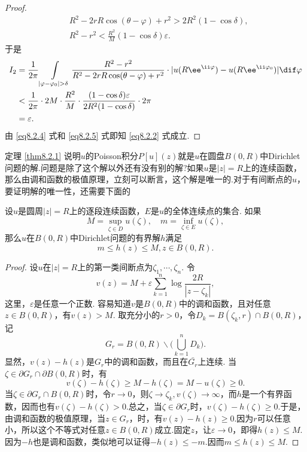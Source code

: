 \begin{proof}
\begin{align*}
&R^2-2rR\cos(\theta-\varphi)+r^2>2R^2(1-\cos\delta),\\
&R^2-r^2<\frac{R^2}M(1-\cos\delta)\varepsilon.
\end{align*}
于是
\begin{equation}\label{eq8.2.5}
\begin{aligned}
I_2&=\frac1{2\pi}\int\limits_{|\varphi-\varphi_0|>\delta}\frac{R^2-r^2}{R^2-2rR
\cos(\theta-\varphi)+r^2}\cdot|u(R\ee^{\ii\varphi})-u(R\ee^{\ii\varphi_0})|\dif \varphi\\
&<\frac1{2\pi}\cdot2M\cdot\frac{R^2}M\cdot\frac{(1-\cos\delta)\varepsilon}
{2R^2(1-\cos\delta)}\cdot2\pi\\
&=\varepsilon.
\end{aligned}
\end{equation}
由 \eqref{eq8.2.4} 式和 \eqref{eq8.2.5} 式即知 \eqref{eq8.2.2} 式成立.
\end{proof}

定理 \ref{thm8.2.1} 说明$u$的Poisson积分$P[u](z)$就是$u$在圆盘$B(0,R)$中Dirichlet问题的解.问题是除了这个解以外还有没有别的解?如果$u$是$|z|=R$上的连续函数，那么由调和函数的极值原理，立刻可以断言，这个解是唯一的.对于有间断点的$u$，要证明解的唯一性，还需要下面的
\begin{prop}\label{prop8.2.2}
设$u$是圆周$|z|=R$上的逐段连续函数，$E$是$u$的全体连续点的集合. 如果
\[M=\sup_{\zeta\in D}u(\zeta),\quad m=\inf_{\zeta\in E}u(\zeta),\]
那么$u$在$B(0,R)$中Dirichlet问题的有界解$h$满足
\[m\le h(z)\le M,z\in B(0,R).\]
\end{prop}
\begin{proof}
设$u$在$|z|=R$上的第一类间断点为$\zeta_1,\cdots,\zeta_n$. 令
\[v(z)=M+\varepsilon\sum_{k=1}^n\log\frac{2R}{|z-\zeta_k|},\]
这里，$\varepsilon$是任意一个正数. 容易知道$v$是$B(0,R)$中的调和函数，且对任意$z\in B(0,R)$，有$v(z)>M$. 取充分小的$r>0$，令$D_k=B(\zeta_k,r)\cap B(0,R)$，记
\[G_r=B(0,R)\backslash\big(\bigcup_{k=1}^nD_k\big).\]
显然，$v(z)-h(z)$是$G_r$中的调和函数，而且在$\bar{G_r}$上连续. 当$\zeta\in\partial G_r\cap\partial B(0,R)$时，有
\[v(\zeta)-h(\zeta)\ge M-h(\zeta)=M-u(\zeta)\ge0.\]
当$\zeta\in\partial G_r\cap B(0,R)$时，令$r\to0$，则$\zeta\to \zeta_k,v(\zeta)\to\infty$，而$h$是一个有界函数，因而也有$v(\zeta)-h(\zeta)>0$.总之，当$\zeta\in\partial G_r$时，$v(\zeta)-h(\zeta)\ge0$.于是，由调和函数的极值原理，当$z\in G_r$，时，有$v(z)-h(z)\ge0$.因为$r$可以任意小，所以这个不等式对任意$z\in B(0,R)$成立.固定$z$，让$\varepsilon\to0$，即得$h(z)\le M$.因为$-h$也是调和函数，类似地可以证得$-h(z)\le -m$.因而$m\le h(z)\le M$.
\end{proof}


